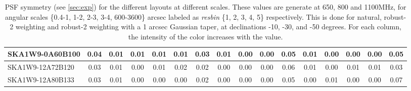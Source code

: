 \begin{table}[H]
{{\begin{tabular}{|lccccc||ccccc||ccccc|}
SKA1W9-0A60B100 & 0.04 \cellcolor{blue!60.00} & 0.01 \cellcolor{red!18.00} & 0.01 \cellcolor{green!60.00} & 0.01 \cellcolor{orange!60.00} & 0.01 \cellcolor{purple!39.00} & 0.03 \cellcolor{blue!60.00} & 0.01 \cellcolor{red!60.00} & 0.00 \cellcolor{green!18.00} & 0.00 \cellcolor{orange!18.00} & 0.05 \cellcolor{purple!46.00} & 0.01 \cellcolor{blue!39.00} & 0.00 \cellcolor{red!18.00} & 0.00 \cellcolor{green!18.00} & 0.00 \cellcolor{orange!18.00} & 0.05 \cellcolor{purple!34.80}\\ \hline 
SKA1W9-12A72B120 & 0.03 \cellcolor{blue!18.00} & 0.01 \cellcolor{red!18.00} & 0.00 \cellcolor{green!18.00} & 0.01 \cellcolor{orange!60.00} & 0.02 \cellcolor{purple!60.00} & 0.02 \cellcolor{blue!18.00} & 0.00 \cellcolor{red!18.00} & 0.00 \cellcolor{green!18.00} & 0.00 \cellcolor{orange!18.00} & 0.06 \cellcolor{purple!60.00} & 0.01 \cellcolor{blue!39.00} & 0.00 \cellcolor{red!18.00} & 0.01 \cellcolor{green!60.00} & 0.01 \cellcolor{orange!60.00} & 0.03 \cellcolor{purple!18.00}\\ \hline 
SKA1W9-12A80B133 & 0.03 \cellcolor{blue!18.00} & 0.01 \cellcolor{red!18.00} & 0.00 \cellcolor{green!18.00} & 0.00 \cellcolor{orange!18.00} & 0.00 \cellcolor{purple!18.00} & 0.02 \cellcolor{blue!18.00} & 0.00 \cellcolor{red!18.00} & 0.00 \cellcolor{green!18.00} & 0.00 \cellcolor{orange!18.00} & 0.05 \cellcolor{purple!46.00} & 0.00 \cellcolor{blue!18.00} & 0.01 \cellcolor{red!60.00} & 0.00 \cellcolor{green!18.00} & 0.00 \cellcolor{orange!18.00} & 0.07 \cellcolor{purple!51.60}\\ \hline 
\end{tabular}}
\vspace{-0.300000cm}
\hspace{1cm} 

\vspace{.25cm}
\caption{PSF symmetry (see \autoref{sec:exp})  for the different layouts at different scales. These values are generate at 650, 800 and 1100MHz, for angular scales \{0.4-1, 1-2, 2-3, 3-4, 600-3600\} arcsec labeled as {\it resbin} \{1, 2, 3, 4, 5\} respectively. This is done for natural, robust-2 weighting and robust-2 weighting with a 1 arcsec Gaussian taper, at declinations -10, -30, and -50 degrees. For each column, the intensity of the color increases with the value.}\label{tab:psf_sym}}
 \end{table}
